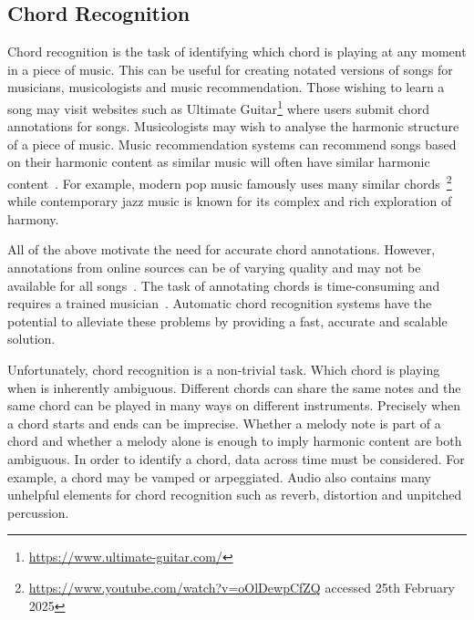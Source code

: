 \subsection{Chord Recognition}

Chord recognition is the task of identifying which chord is playing at any moment in a piece of music. This can be useful for creating notated versions of songs for musicians, musicologists and music recommendation. Those wishing to learn a song may visit websites such as Ultimate Guitar\footnote{\url{https://www.ultimate-guitar.com/}} where users submit chord annotations for songs. Musicologists may wish to analyse the harmonic structure of a piece of music. Music recommendation systems can recommend songs based on their harmonic content as similar music will often have similar harmonic content~\citep{MusicGenreClassification}. For example, modern pop music famously uses many similar chords~\footnote{\url{https://www.youtube.com/watch?v=oOlDewpCfZQ} accessed 25th February 2025} while contemporary jazz music is known for its complex and rich exploration of harmony.

All of the above motivate the need for accurate chord annotations. However, annotations from online sources can be of varying quality and may not be available for all songs~\citep{Choco}. The task of annotating chords is time-consuming and requires a trained musician~\citep{McgillBillboard}. Automatic chord recognition systems have the potential to alleviate these problems by providing a fast, accurate and scalable solution.

Unfortunately, chord recognition is a non-trivial task. Which chord is playing when is inherently ambiguous. Different chords can share the same notes and the same chord can be played in many ways on different instruments. Precisely when a chord starts and ends can be imprecise. Whether a melody note is part of a chord and whether a melody alone is enough to imply harmonic content are both ambiguous. In order to identify a chord, data across time must be considered. For example, a chord may be vamped or arpeggiated. Audio also contains many unhelpful elements for chord recognition such as reverb, distortion and unpitched percussion.


